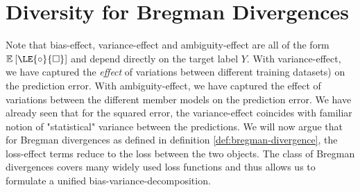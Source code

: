 \documentclass[../main.tex]{subfiles}
\begin{document}
\section{Diversity for Bregman Divergences} \label{sec:bregman-divergences}




Note that bias-effect, variance-effect and ambiguity-effect are all of the form $\mathbb{E}_{}\left[ \LE{\circ}{\square} \right]$ and depend directly on the target label $Y$. 
With variance-effect, we have captured the \textit{effect} of variations between different training datasets) on the prediction error.
With ambiguity-effect, we have captured the effect of variations between the different member models on the prediction error.
We have already seen that for the squared error, the variance-effect coincides with familiar notion of "statistical" variance between the predictions.
We will now argue that for Bregman divergences as defined in definition \ref{def:bregman-divergence}, the loss-effect terms reduce to the loss between the two objects.
The class of Bregman divergences covers many widely used loss functions and thus allows us to formulate a unified bias-variance-decomposition. 
\end{document}
